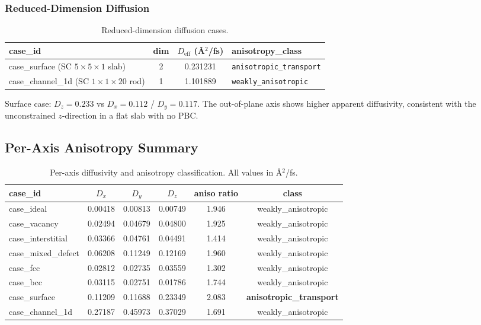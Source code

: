 \documentclass[11pt,a4paper]{article}
\begin{document}
\subsubsection{Reduced-Dimension Diffusion}

\begin{table}[h!]
\centering
\begin{tabular}{lccl}
\toprule
\textbf{case\_id} & \textbf{dim} & \textbf{$D_\text{eff}$ (\AA$^2$/fs)} & \textbf{anisotropy\_class} \\
\midrule
case\_surface (SC $5\times5\times1$ slab) & 2 & 0.231231 & \texttt{anisotropic\_transport} \\
case\_channel\_1d (SC $1\times1\times20$ rod) & 1 & 1.101889 & \texttt{weakly\_anisotropic} \\
\bottomrule
\end{tabular}
\caption{Reduced-dimension diffusion cases.}
\end{table}

Surface case: $D_z = 0.233$ vs $D_x = 0.112$ / $D_y = 0.117$. The out-of-plane axis shows
higher apparent diffusivity, consistent with the unconstrained $z$-direction in a flat slab
with no PBC.

\subsection{Per-Axis Anisotropy Summary}

\begin{table}[h!]
\centering
\small
\begin{tabular}{lccccc}
\toprule
\textbf{case\_id} & \textbf{$D_x$} & \textbf{$D_y$} & \textbf{$D_z$} & \textbf{aniso ratio} & \textbf{class} \\
\midrule
case\_ideal         & 0.00418 & 0.00813 & 0.00749 & 1.946 & weakly\_anisotropic \\
case\_vacancy       & 0.02494 & 0.04679 & 0.04800 & 1.925 & weakly\_anisotropic \\
case\_interstitial  & 0.03366 & 0.04761 & 0.04491 & 1.414 & weakly\_anisotropic \\
case\_mixed\_defect & 0.06208 & 0.11249 & 0.12169 & 1.960 & weakly\_anisotropic \\
case\_fcc           & 0.02812 & 0.02735 & 0.03559 & 1.302 & weakly\_anisotropic \\
case\_bcc           & 0.03115 & 0.02751 & 0.01786 & 1.744 & weakly\_anisotropic \\
case\_surface       & 0.11209 & 0.11688 & 0.23349 & 2.083 & \textbf{anisotropic\_transport} \\
case\_channel\_1d   & 0.27187 & 0.45973 & 0.37029 & 1.691 & weakly\_anisotropic \\
\bottomrule
\end{tabular}
\caption{Per-axis diffusivity and anisotropy classification. All values in \AA$^2$/fs.}
\end{table}
\end{document}
